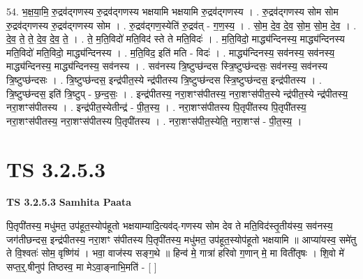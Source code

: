 \documentclass[17pt]{extarticle}
\begin{document}
54. भ॒क्ष॒या॒मि॒ रु॒द्रव॑द्‍गणस्य रु॒द्रव॑द्‍गणस्य भक्षयामि भक्षयामि रु॒द्रव॑द्‍गणस्य । . रु॒द्रव॑द्‍गणस्य सोम सोम रु॒द्रव॑द्‍गणस्य रु॒द्रव॑द्‍गणस्य सोम । . रु॒द्रव॑द्‍गण॒स्येति॑ रु॒द्रव॑त् - ग॒ण॒स्य॒ । . सो॒म॒ दे॒व॒ दे॒व॒ सो॒म॒ सो॒म॒ दे॒व॒ । . दे॒व॒ ते॒ ते॒ दे॒व॒ दे॒व॒ ते॒ । . ते॒ म॒ति॒विदो॑ मति॒विद॑ स्ते ते मति॒विदः॑ । . म॒ति॒विदो॒ माद्ध्य॑न्दिनस्य॒ माद्ध्य॑न्दिनस्य मति॒विदो॑ मति॒विदो॒ माद्ध्य॑न्दिनस्य । . म॒ति॒विद॒ इति॑ मति - विदः॑ । . माद्ध्य॑न्दिनस्य॒ सव॑नस्य॒ सव॑नस्य॒ माद्ध्य॑न्दिनस्य॒ माद्ध्य॑न्दिनस्य॒ सव॑नस्य । . सव॑नस्य त्रि॒ष्टुप्छ॑न्दस स्त्रि॒ष्टुप्छ॑न्दसः॒ सव॑नस्य॒ सव॑नस्य त्रि॒ष्टुप्छ॑न्दसः । . त्रि॒ष्टुप्छ॑न्दस॒ इन्द्र॑पीत॒स्ये न्द्र॑पीतस्य त्रि॒ष्टुप्छ॑न्दस स्त्रि॒ष्टुप्छ॑न्दस॒ इन्द्र॑पीतस्य । . त्रि॒ष्टुप्छ॑न्दस॒ इति॑ त्रि॒ष्टुप् - छ॒न्द॒सः॒ । . इन्द्र॑पीतस्य॒ नरा॒शꣳस॑पीतस्य॒ नरा॒शꣳस॑पीत॒स्ये न्द्र॑पीत॒स्ये न्द्र॑पीतस्य॒ नरा॒शꣳस॑पीतस्य । . इन्द्र॑पीत॒स्येतीन्द्र॑ - पी॒त॒स्य॒ । . नरा॒शꣳस॑पीतस्य पि॒तृपी॑तस्य पि॒तृपी॑तस्य॒ नरा॒शꣳस॑पीतस्य॒ नरा॒शꣳस॑पीतस्य पि॒तृपी॑तस्य । . नरा॒शꣳस॑पीत॒स्येति॒ नरा॒शꣳस॑ - पी॒त॒स्य॒ । \newline


\section{ TS 3.2.5.3 }

\textbf{TS 3.2.5.3 } \newline
\textbf{Samhita Paata} \newline

पि॒तृपी॑तस्य॒ मधु॑मत॒ उप॑हूत॒स्योप॑हूतो भक्षयाम्यादि॒त्यव॑द्-गणस्य सोम देव ते मति॒विद॑स्तृ॒तीय॑स्य॒ सव॑नस्य॒ जग॑तीछन्दस॒ इन्द्र॑पीतस्य॒ नरा॒शꣳ स॑पीतस्य पि॒तृपी॑तस्य॒ मधु॑मत॒ उप॑हूत॒स्योप॑हूतो भक्षयामि ॥ आप्या॑यस्व॒ समे॑तु ते वि॒श्वतः॑ सोम॒ वृष्णि॑यं । भवा॒ वाज॑स्य सङ्ग॒थे ॥ हिन्व॑ मे॒ गात्रा॑ हरिवो ग॒णान् मे॒ मा विती॑तृषः । शि॒वो मे॑ सप्त॒र्॒.षीनुप॑ तिष्ठस्व॒ मा मेऽवा॒ङ्नाभि॒मति॑ - [  ] \newline
\end{document}
